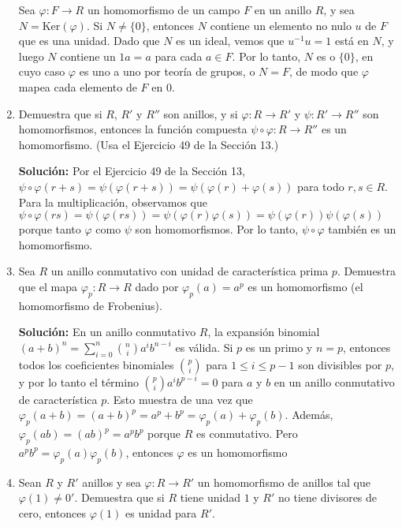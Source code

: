 \begin{enumerate}
Sea \( \varphi: F \rightarrow R \) un homomorfismo de un campo \( F \) en un anillo \( R \), y sea \( N = \text{Ker}(\varphi) \). Si \( N \neq \{0\} \), entonces \( N \) contiene un elemento no nulo \( u \) de \( F \) que es una unidad. Dado que \( N \) es un ideal, vemos que \( u^{-1} u = 1 \) está en \( N \), y luego \( N \) contiene un \( 1a= a \) para cada \( a \in F \). Por lo tanto, \( N \) es o \( \{0\} \), en cuyo caso \( \varphi \) es uno a uno por teoría de grupos, o \( N = F \), de modo que \( \varphi \) mapea cada elemento de \( F \) en \( 0 \).

\item Demuestra que si $R$, $R'$ y $R''$ son anillos, y si $\varphi : R \rightarrow R'$ y $\psi : R' \rightarrow R''$ son homomorfismos, entonces la función compuesta $\psi \circ \varphi : R \rightarrow R''$ es un homomorfismo. (Usa el Ejercicio 49 de la Sección 13.)

\textbf{Solución:}
Por el Ejercicio 49 de la Sección 13, $\psi \circ \varphi(r + s) = \psi(\varphi(r + s)) = \psi(\varphi(r) + \varphi(s))$ para todo $r, s \in R$. Para la multiplicación, observamos que $\psi \circ \varphi(rs) = \psi(\varphi(rs)) = \psi(\varphi(r)\varphi(s)) = \psi(\varphi(r))\psi(\varphi(s))$ porque tanto $\varphi$ como $\psi$ son homomorfismos. Por lo tanto, $\psi \circ \varphi$ también es un homomorfismo.

\item Sea \( R \) un anillo conmutativo con unidad de característica prima \( p \). Demuestra que el mapa \( \varphi_p : R \rightarrow R \) dado por \( \varphi_p(a) = a^p \) es un homomorfismo (el homomorfismo de Frobenius).

\textbf{Solución:}
En un anillo conmutativo \( R \), la expansión binomial \( (a + b)^n = \sum_{i=0}^{n} \binom{n}{i} a^i b^{n-i} \) es válida. Si \( p \) es un primo y \( n = p \), entonces todos los coeficientes binomiales \( \binom{p}{i} \) para \( 1 \leq i \leq p - 1 \) son divisibles por \( p \), y por lo tanto el término \( \binom{p}{i} a^i b^{p-i} = 0 \) para \( a \) y \( b \) en un anillo conmutativo de característica \( p \). Esto muestra de una vez que \( \varphi_p(a + b) = (a + b)^p = a^p + b^p = \varphi_p(a) + \varphi_p(b) \). Además, \( \varphi_p(ab) = (ab)^p = a^p b^p \) porque \( R \) es conmutativo. Pero \( a^p b^p = \varphi_p(a) \varphi_p(b) \), entonces \( \varphi \) es un homomorfismo

\item Sean \( R \) y \( R' \) anillos y sea \( \varphi : R \rightarrow R' \) un homomorfismo de anillos tal que \( \varphi(1) \neq 0' \). Demuestra que si \( R \) tiene unidad \( 1 \) y \( R' \) no tiene divisores de cero, entonces \( \varphi(1) \) es unidad para \( R' \).


\end{enumerate}
